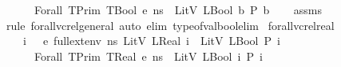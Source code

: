 \begin{isabellebody}
\ \ \ \ {\isachardoublequoteopen}{\isasymLambda}{\isacharcomma}{\kern0pt}{\isasymGamma}{\isacharcomma}{\kern0pt}{\isasymOmega}\ {\isasymturnstile}\ {\isasymlangle}Forall\ {\isacharparenleft}{\kern0pt}TPrim\ TBool{\isacharparenright}{\kern0pt}\ e{\isacharcomma}{\kern0pt}\ ns{\isasymrangle}\ {\isasymDown}\ LitV\ {\isacharparenleft}{\kern0pt}LBool\ {\isacharparenleft}{\kern0pt}{\isasymforall}b{\isachardot}{\kern0pt}\ P\ b{\isacharparenright}{\kern0pt}{\isacharparenright}{\kern0pt}{\isachardoublequoteclose}\isanewline
%
\isadelimproof
\ \ %
\endisadelimproof
%
\isatagproof
{}\isamarkupfalse%
\ assms\isanewline
\ \ \isamarkupfalse%
\ {\isacharparenleft}{\kern0pt}rule\ forall{\isacharunderscore}{\kern0pt}vc{\isacharunderscore}{\kern0pt}rel{\isacharunderscore}{\kern0pt}general{\isacharcomma}{\kern0pt}\ auto\ elim{\isacharcolon}{\kern0pt}\ type{\isacharunderscore}{\kern0pt}of{\isacharunderscore}{\kern0pt}val{\isacharunderscore}{\kern0pt}bool{\isacharunderscore}{\kern0pt}elim{\isacharparenright}{\kern0pt}%
\endisatagproof
{\isafoldproof}%
%
\isadelimproof
\isanewline
%
\endisadelimproof
\isanewline
{}\isamarkupfalse%
\ forall{\isacharunderscore}{\kern0pt}vc{\isacharunderscore}{\kern0pt}rel{\isacharunderscore}{\kern0pt}real{\isacharcolon}{\kern0pt}\ \isanewline
\ \ \ {\isachardoublequoteopen}{\isasymAnd}\ i{\isachardot}{\kern0pt}\ {\isasymLambda}{\isacharcomma}{\kern0pt}{\isasymGamma}{\isacharcomma}{\kern0pt}{\isasymOmega}\ {\isasymturnstile}\ {\isasymlangle}e{\isacharcomma}{\kern0pt}\ full{\isacharunderscore}{\kern0pt}ext{\isacharunderscore}{\kern0pt}env\ ns\ {\isacharparenleft}{\kern0pt}LitV\ {\isacharparenleft}{\kern0pt}LReal\ i{\isacharparenright}{\kern0pt}{\isacharparenright}{\kern0pt}{\isasymrangle}\ {\isasymDown}\ LitV\ {\isacharparenleft}{\kern0pt}LBool\ {\isacharparenleft}{\kern0pt}P\ i{\isacharparenright}{\kern0pt}{\isacharparenright}{\kern0pt}{\isachardoublequoteclose}\isanewline
\ \ \ \ {\isachardoublequoteopen}{\isasymLambda}{\isacharcomma}{\kern0pt}{\isasymGamma}{\isacharcomma}{\kern0pt}{\isasymOmega}\ {\isasymturnstile}\ {\isasymlangle}Forall\ {\isacharparenleft}{\kern0pt}TPrim\ TReal{\isacharparenright}{\kern0pt}\ e{\isacharcomma}{\kern0pt}\ ns{\isasymrangle}\ {\isasymDown}\ LitV\ {\isacharparenleft}{\kern0pt}LBool\ {\isacharparenleft}{\kern0pt}{\isasymforall}i{\isachardot}{\kern0pt}\ P\ i{\isacharparenright}{\kern0pt}{\isacharparenright}{\kern0pt}{\isachardoublequoteclose}\isanewline
%
\isadelimproof
\ \ %
\endisadelimproof
%
\isatagproof

\end{isabellebody}
